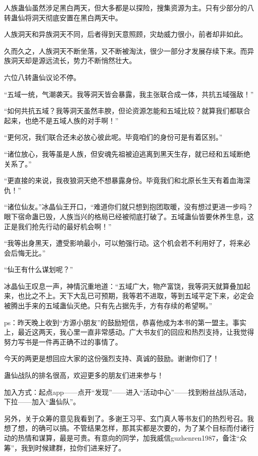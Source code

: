 \begin{this_body}
人族蛊仙虽然涉足黑白两天，但大多都是以探险，搜集资源为主。只有少部分的八转蛊仙将洞天彻底安置在黑白两天中。

人族洞天和异族洞天不同，后者得到天意照顾，灾劫威力很小，前者却非如此。

久而久之，人族洞天不断坐落，又不断被淘汰，很少一部分才发展存续下来。而异族洞天却是源远流长，势力不断悄然壮大。

六位八转蛊仙议论不停。

“五域一统，气潮袭天。我等洞天皆会暴露，我主张联合成一体，共抗五域强敌！”

“如何共抗五域？我等洞天虽然丰腴，但论资源怎能和五域比较？就算我们都联合起来，也绝不是五域人族的对手啊！”

“更何况，我们联合还未必放心彼此呢。毕竟咱们的身份可是有着区别。”

“诸位放心，我等虽是人族，但安魂先祖被迫逃离到黑天生存，就已经和五域断绝关系了。”

“更直接的来说，我夜狼洞天绝不想暴露身份。毕竟我们和北原长生天有着血海深仇！”

“诸位仙友。”冰晶仙王开口，“难道你们就只想到抱团取暖，没有想过更进一步吗？眼下宿命蛊已毁，人族当兴的格局已经被彻底打破了。五域蛊仙皆要休养生息，这正是我们抢先行动的最好机会啊！”

“我等出身黑天，遭受影响最小，可以勉强行动。这个机会若不利用好了，将来必会后悔无比。”

“仙王有什么谋划呢？”

冰晶仙王叹息一声，神情沉重地道：“五域广大，物产富饶，我等洞天就算叠加起来，也比之不上。天下大乱已可预期，我等若不进取，等到五域平定下来，必定会被腾出手来的五域蛊仙灭绝。只有先占据先手，方有存续的希望啊。”

ps：昨天晚上收到“方源小朋友”的鼓励短信，恭喜他成为本书的第一盟主。事实上，最近这两天，我心里一直非常感动。广大书友们的回应和热烈支持，让我觉得努力写书是一件再正确不过的事情了。

今天的两更是想回应大家的这份强烈支持、真诚的鼓励。谢谢你们了！

蛊仙战队的排名很高，欢迎更多的朋友们进来参与！

加入方式：起点app——点开“发现”——进入“活动中心”——找到粉丝战队活动，下拉——加入“蛊仙队”。

另外，关于众筹的意见我看到了。多谢王习平、玄门真人等书友们的热烈号召。我想了想，的确可以搞。不管结果怎样，那其实都是次要的，为了某个目标而付诸行动的热情和谋算，最是可贵。有意向的同学，加我威信guzhenren1987，备注“众筹”，我到时候建群，拉你们进来好了。

\end{this_body}

